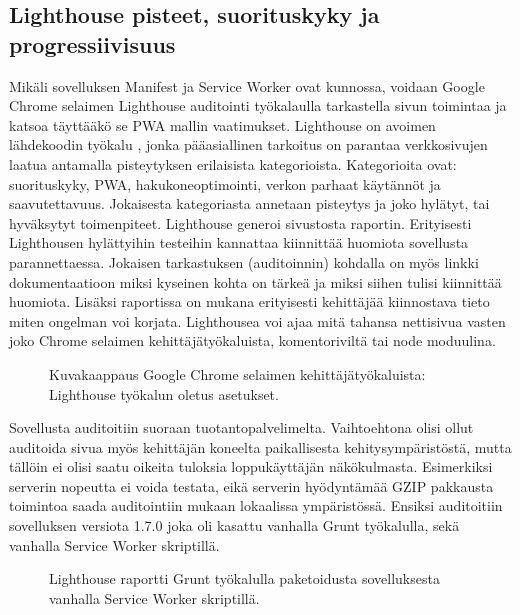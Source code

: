 \documentclass{tktltiki}
\begin{document}
\subsection{Lighthouse pisteet, suorituskyky ja progressiivisuus}

Mikäli sovelluksen Manifest ja Service Worker ovat kunnossa, voidaan Google Chrome selaimen Lighthouse auditointi työkalaulla tarkastella sivun toimintaa ja katsoa täyttääkö se PWA mallin vaatimukset. Lighthouse on avoimen lähdekoodin työkalu \cite{Google2}, jonka pääasiallinen tarkoitus on parantaa verkkosivujen laatua antamalla pisteytyksen erilaisista kategorioista. Kategorioita ovat: suorituskyky, PWA, hakukoneoptimointi, verkon parhaat käytännöt ja saavutettavuus. Jokaisesta kategoriasta annetaan pisteytys ja joko hylätyt, tai hyväksytyt toimenpiteet. Lighthouse generoi sivustosta raportin. Erityisesti Lighthousen hylättyihin testeihin kannattaa kiinnittää huomiota sovellusta parannettaessa. Jokaisen tarkastuksen (auditoinnin) kohdalla on myös linkki dokumentaatioon miksi kyseinen kohta on tärkeä ja miksi siihen tulisi kiinnittää huomiota. Lisäksi raportissa on mukana erityisesti kehittäjää kiinnostava tieto miten ongelman voi korjata. Lighthousea voi ajaa mitä tahansa nettisivua vasten joko Chrome selaimen kehittäjätyökaluista, komentoriviltä tai node moduulina.

\begin{figure}[h]
\begin{center}
\caption{Kuvakaappaus Google Chrome selaimen kehittäjätyökaluista: Lighthouse työkalun oletus asetukset.}
\label{Lighthouse}
\end{center}
\end{figure}

\clearpage

Sovellusta auditoitiin suoraan tuotantopalvelimelta. Vaihtoehtona olisi ollut auditoida sivua myös kehittäjän koneelta paikallisesta kehitysympäristöstä, mutta tällöin ei olisi saatu oikeita tuloksia loppukäyttäjän näkökulmasta. Esimerkiksi serverin nopeutta ei voida testata, eikä serverin hyödyntämää GZIP pakkausta toimintoa saada auditointiin mukaan lokaalissa ympäristössä. Ensiksi auditoitiin sovelluksen versiota 1.7.0 joka oli kasattu vanhalla Grunt työkalulla, sekä vanhalla Service Worker skriptillä. 

\begin{figure}[h]
\begin{center}
\caption{Lighthouse raportti Grunt työkalulla paketoidusta sovelluksesta vanhalla Service Worker skriptillä.}
\label{Lighthouse raportti 1}
\end{center}
\end{figure}
\end{document}
